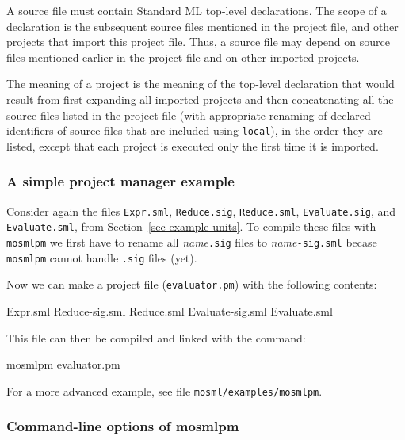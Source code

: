 \documentclass[fleqn,a4paper]{article}
\begin{document}
A source file must contain Standard ML top-level declarations.  The
scope of a declaration is the subsequent source files mentioned in the
project file, and other projects that import this project file.  Thus,
a source file may depend on source files mentioned earlier in the
project file and on other imported projects.  

The meaning of a project is the meaning of the top-level declaration
that would result from first expanding all imported projects and then
concatenating all the source files listed in the project file (with
appropriate renaming of declared identifiers of source files that are
included using \texttt{local}), in the order they are listed, except
that each project is executed only the first time it is imported.
 

\subsubsection{A simple project manager example}
\label{sec:simple-example}

Consider again the files \texttt{Expr.sml}, \texttt{Reduce.sig},
\texttt{Reduce.sml}, \texttt{Evaluate.sig}, and \texttt{Evaluate.sml},
from Section~\ref{sec-example-units}.  To compile these files with
\texttt{mosmlpm} we first have to rename all
\textit{name}\texttt{.sig} files to \textit{name}\texttt{-sig.sml}
becase \texttt{mosmlpm} cannot handle \texttt{.sig} files (yet).

Now we can make a project file (\texttt{evaluator.pm}) with the
following contents:

\begin{program}
Expr.sml
Reduce-sig.sml
Reduce.sml 
Evaluate-sig.sml
Evaluate.sml
\end{program}

\noindent 
This file can then be compiled and linked with the command:

\begin{program}
mosmlpm evaluator.pm
\end{program}

\noindent For a more advanced example, see file
\texttt{mosml/examples/mosmlpm}. 



\subsubsection{Command-line options of mosmlpm}
\label{sec:command-line-options-mosmlpm}

\newenvironment{commandlineoptions}{%
  \begin{list}{}%
    {\renewcommand{\makelabel}[1]{\parbox[b]{\labelwidth}{%
          \makebox[0pt][l]{\texttt{##1}}\\}}}
  }
  {\end{list}}
\end{document}
